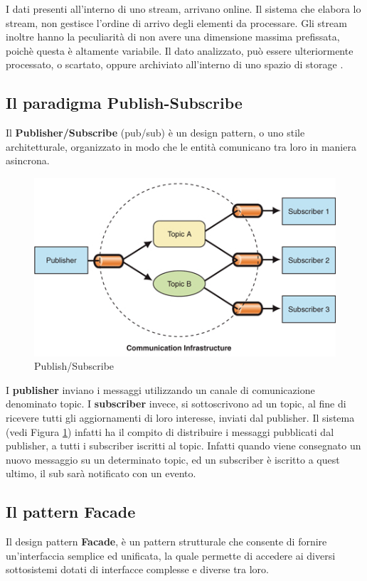 \documentclass[12pt]{article}
\begin{document}
I dati presenti all'interno di uno stream, arrivano online. Il sistema che elabora lo stream, non gestisce l'ordine di arrivo degli elementi da processare. Gli stream inoltre hanno la peculiarità di non avere una dimensione massima prefissata, poichè questa è altamente variabile. Il dato analizzato, può essere ulteriormente processato, o scartato, oppure archiviato all'interno di uno spazio di storage \cite{Babcock:2002:MID:543613.543615}.

\subsection{Il paradigma Publish-Subscribe}
Il \textbf{Publisher/Subscribe} (pub/sub) è un design pattern, o uno stile architetturale, organizzato in modo che le entità comunicano tra loro in maniera asincrona.

\begin{figure}[H]
	\centering
	\includegraphics[scale=0.50]{images/pubsub.jpg}
	\caption{Publish/Subscribe}
	\label{pubsub}
\end{figure}

I \textbf{publisher} inviano i messaggi utilizzando un canale di comunicazione denominato topic.
I \textbf{subscriber} invece, si sottoscrivono ad un topic, al fine di ricevere tutti gli aggiornamenti di loro interesse, inviati dal publisher.
Il sistema (vedi Figura \ref{pubsub}) infatti ha il compito di distribuire i messaggi pubblicati dal publisher, a tutti i subscriber iscritti al topic. Infatti quando viene consegnato un nuovo messaggio su un determinato topic, ed un subscriber è iscritto a quest ultimo, il sub sarà notificato con un evento.

\subsection{Il pattern Facade}
Il design pattern \textbf{Facade}, è un pattern strutturale che consente di fornire un'interfaccia semplice ed unificata, la quale permette di accedere ai diversi sottosistemi dotati di interfacce complesse e diverse tra loro.
\end{document}
